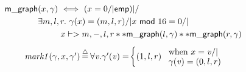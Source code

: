 \documentclass[acmsmall,screen]{acmart}  %
\newcommand{\defeq}{\mathbin{\stackrel{\triangle}{=}}} %
\newcommand{\p}[1]{\ensuremath{\mathsf{#1}}} \newcommand{\m}[1]{\ensuremath{\mathit{#1}}} \newcommand{\ma}[1]{\ensuremath{\mathcal{#1}}} \let\ramify\lightning
\providecommand{\DIFadd}[1]{{\protect\color{blue}\uwave{#1}}} %
\providecommand{\DIFaddFL}[1]{\DIFadd{#1}} %
\providecommand{\DIFaddbeginFL}{} %
\providecommand{\DIFaddendFL}{} %
\providecommand{\DIFdelbeginFL}{} %
\providecommand{\DIFdelendFL}{} %
\newcommand{\DIFscaledelfig}{0.5}
\newlength{\DIFdelgraphicswidth} %
\newlength{\DIFdelgraphicsheight} %
\newcommand{\DIFaddincludegraphics}[2][]{{\color{blue}\fbox{\DIFOincludegraphics[#1]{#2}}}} %
\newcommand{\DIFdelincludegraphics}[2][]{%
\sbox{\DIFdelgraphicsbox}{\DIFOincludegraphics[#1]{#2}}%
\settoboxwidth{\DIFdelgraphicswidth}{\DIFdelgraphicsbox} %
\settoboxtotalheight{\DIFdelgraphicsheight}{\DIFdelgraphicsbox} %
\scalebox{\DIFscaledelfig}{%
\parbox[b]{\DIFdelgraphicswidth}{\usebox{\DIFdelgraphicsbox}\\[-\baselineskip] \rule{\DIFdelgraphicswidth}{0em}}\llap{\resizebox{\DIFdelgraphicswidth}{\DIFdelgraphicsheight}{%
\setlength{\unitlength}{\DIFdelgraphicswidth}%
\begin{picture}(1,1)%
\thicklines\linethickness{2pt} %
{\color[rgb]{1,0,0}\put(0,0){\framebox(1,1){}}}%
{\color[rgb]{1,0,0}\put(0,0){\line( 1,1){1}}}%
{\color[rgb]{1,0,0}\put(0,1){\line(1,-1){1}}}%
\end{picture}%
}\hspace*{3pt}}} %
} %
\DeclareRobustCommand{\DIFaddbeginFL}{\DIFOaddbeginFL \let\includegraphics\DIFaddincludegraphics} %
\DeclareRobustCommand{\DIFaddendFL}{\DIFOaddendFL \let\includegraphics\DIFOincludegraphics} %
\DeclareRobustCommand{\DIFdelbeginFL}{\DIFOdelbeginFL \let\includegraphics\DIFdelincludegraphics} %
\DeclareRobustCommand{\DIFdelendFL}{\DIFOaddendFL \let\includegraphics\DIFOincludegraphics} %
\begin{document}
\begin{figure}[t]
\DIFaddendFL 


{\footnotesize
\begin{flushleft}
\DIFdelbeginFL %
\DIFdelendFL \DIFaddbeginFL \DIFaddFL{\hspace{-3em}
}\begin{minipage}[c]{0.55\textwidth}
\DIFaddendFL \begin{equation}
\label{eqn:bigraphintrofoldunfold}
\DIFdelbeginFL %
\DIFdelendFL \DIFaddbeginFL \begin{split}
\quad \p{m\_graph}&(x, \gamma) ~ <=> ~ (x = 0 /| \p{emp}) |/ \null \\
& \exists m,l,r.~ \gamma(x)=(m,l,r) /| x~\mathsf{mod}~16 = 0 /| \null \\
& \qquad ~~ x |-> m,-,l,r ** \p{m\_graph}(l, \gamma) ** \p{m\_graph}(r, \gamma)
\end{split}
\DIFaddendFL \end{equation}
\begin{equation*}
\DIFdelbeginFL %
\DIFdelendFL \DIFaddbeginFL \begin{array}{l@{\hspace{2pt}}c@{\hspace{2pt}}l}
\quad \m{mark1}(\gamma,x,\gamma') & \defeq & \forall \m{v}. \gamma'(\m{v}) = \! \begin{cases}
(1,l,r) \! & \begin{array}{@{}l@{}}\text{when } x = \m{v} /| \null \\[-3pt] \gamma(\m{v}) = (0,l,r) \end{array} \DIFaddendFL \\

\end{cases}
\end{array}
\end{equation*}
\end{minipage}
\end{flushleft}}
\end{figure}
\end{document}
